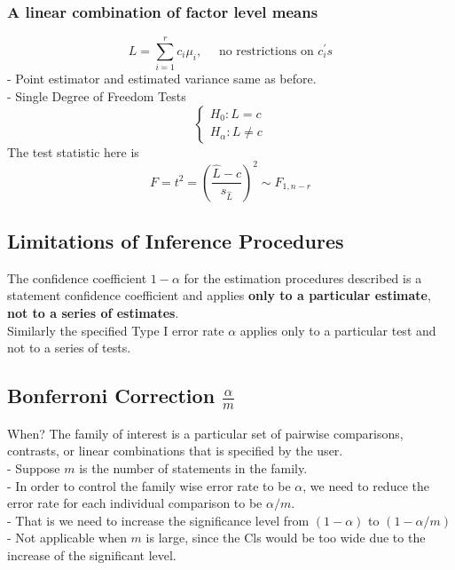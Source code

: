 \documentclass[11pt,a4paper]{article}
\begin{document}
\subsubsection{A linear combination of factor level means}
$$
L=\sum_{i=1}^{r} c_{i} \mu_{i}, \quad \text { no restrictions on } c_{i}^{\prime} s
$$
- Point estimator and estimated variance same as before.\\
- Single Degree of Freedom Tests
$$
\left\{\begin{array}{l}
H_{0}: L=c \\
H_{\alpha}: L \neq c
\end{array}\right.
$$
The test statistic here is
$$
F=t^{2}=\left(\frac{\hat{L}-c}{s_{\hat{L}}}\right)^{2} \sim F_{1, n-r}
$$
\subsection{Limitations of Inference Procedures}
The conﬁdence coeﬃcient $1-\alpha$ for the estimation procedures described is a statement conﬁdence coeﬃcient and applies \textbf{only to a particular estimate}, \textbf{not to a series of estimates}.\\
Similarly the speciﬁed Type I error rate $\alpha$ applies only to a particular test and not to a series of tests.

\subsection{Bonferroni Correction $\frac{\alpha}{m}$}
When? The family of interest is a particular set of pairwise comparisons, contrasts, or linear combinations that is specified by the user.\\
- Suppose $m$ is the number of statements in the family.\\
- In order to control the family wise error rate to be $\alpha$, we need to reduce the error rate for each individual comparison to be $\alpha / m$.\\
- That is we need to increase the significance level from $(1-\alpha)$ to $(1-\alpha / m)$\\
- Not applicable when $m$ is large, since the Cls would be too wide due to the increase of the significant level.
\end{document}
